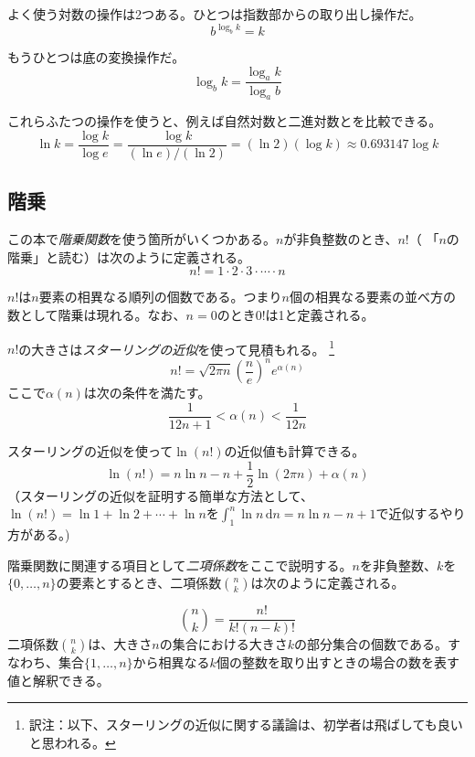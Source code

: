 よく使う対数の操作は2つある。ひとつは指数部からの取り出し操作だ。
\[
    b^{\log_b k} = k
\]

もうひとつは底の変換操作だ。
\[
    \log_b k = \frac{\log_a k}{\log_a b}
\]

これらふたつの操作を使うと、例えば自然対数と二進対数とを比較できる。
\[
   \ln k = \frac{\log k}{\log e} = \frac{\log k}{(\ln e)/(\ln 2)} =
    (\ln 2)(\log k) \approx 0.693147\log k
\]

\subsection{階乗}

この本で\emph{階乗関数}を使う箇所がいくつかある。$n$が非負整数のとき、$n!$（ 「$n$の階乗」と読む）は次のように定義される。
\[
   n! = 1\cdot2\cdot3\cdot\cdots\cdot n
\]

$n!$は$n$要素の相異なる順列の個数である。つまり$n$個の相異なる要素の並べ方の数として階乗は現れる。なお、$n=0$のとき$0!$は1と定義される。

%
$n!$の大きさは\emph{スターリングの近似}を使って見積もれる。
\footnote{訳注：以下、スターリングの近似に関する議論は、初学者は飛ばしても良いと思われる。}
\[
  n!
   = \sqrt{2\pi n}\left(\frac{n}{e}\right)^{n}e^{\alpha(n)}
\]
ここで$\alpha(n)$は次の条件を満たす。
\[
   \frac{1}{12n+1} <  \alpha(n) < \frac{1}{12n}
\]

スターリングの近似を使って$\ln(n!)$の近似値も計算できる。
\[
   \ln(n!) = n\ln n - n + \frac{1}{2}\ln(2\pi n) + \alpha(n)
\]
（スターリングの近似を証明する簡単な方法として、$\ln(n!)=\ln 1 + \ln 2  + \cdots + \ln n$を$\int_1^n \ln n\,\mathrm{d}n = n\ln n - n +1$で近似するやり方がある。)

%
階乗関数に関連する項目として\emph{二項係数}をここで説明する。$n$を非負整数、$k$を$\{0,\ldots,n\}$の要素とするとき、二項係数$\binom{n}{k}$は次のように定義される。

\[
   \binom{n}{k} = \frac{n!}{k!(n-k)!}
\]
二項係数$\binom{n}{k}$は、大きさ$n$の集合における大きさ$k$の部分集合の個数である。すなわち、集合$\{1,\ldots,n\}$から相異なる$k$個の整数を取り出すときの場合の数を表す値と解釈できる。 %

